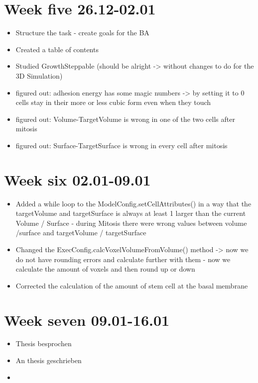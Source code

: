 \section{Week five 26.12-02.01}
\begin{itemize}
\item Structure the task - create goals for the BA
\item Created a table of contents
\item Studied GrowthSteppable (should be alright -> without changes to do for the 3D Simulation)
\item figured out: adhesion energy has some magic numbers -> by setting it to 0 cells stay in their more or less cubic form even when they touch
\item figured out: Volume-TargetVolume is wrong in one of the two cells after mitosis
\item figured out: Surface-TargetSurface is wrong in every cell after mitosis
\end{itemize}

\section{Week six 02.01-09.01}
\begin{itemize}
\item Added a while loop to the ModelConfig.setCellAttributes() in a way that the targetVolume and targetSurface is always at least 1 larger than the current Volume / Surface - during Mitosis there were wrong values between volume /surface and targetVolume / targetSurface
\item Changed the ExecConfig.calcVoxelVolumeFromVolume() method -> now we do not have rounding errors and calculate further with them - now we calculate the amount of voxels and then round up or down
\item Corrected the calculation of the amount of stem cell at the basal membrane
\end{itemize}

\section{Week seven 09.01-16.01}
\begin{itemize}
\item Thesis besprochen
\item An thesis geschrieben
\item 
\end{itemize}

